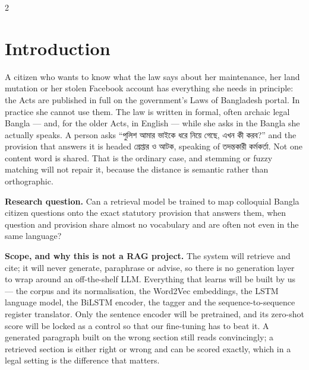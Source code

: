 \documentclass[11pt]{article}
\newcommand{\bng}[1]{{\bn #1}}
\begin{document}
\begin{multicols}{2}
\fontsize{9.3}{10.6}\selectfont
\raggedcolumns

\section{Introduction}
A citizen who wants to know what the law says about her maintenance, her land mutation or her stolen Facebook account has everything she needs in principle: the Acts are published in full on the government's Laws of Bangladesh portal. In practice she cannot use them. The law is written in formal, often archaic legal Bangla --- and, for the older Acts, in English --- while she asks in the Bangla she actually speaks. A person asks ``\bng{পুলিশ আমার ভাইকে ধরে নিয়ে গেছে, এখন কী করব?}'' and the provision that answers it is headed \bng{গ্রেপ্তার ও আটক}, speaking of \bng{তদন্তকারী কর্মকর্তা}. Not one content word is shared. That is the ordinary case, and stemming or fuzzy matching will not repair it, because the distance is semantic rather than orthographic.

\textbf{Research question.} Can a retrieval model be trained to map colloquial Bangla citizen questions onto the exact statutory provision that answers them, when question and provision share almost no vocabulary and are often not even in the same language?

\textbf{Scope, and why this is not a RAG project.} The system will retrieve and cite; it will never generate, paraphrase or advise, so there is no generation layer to wrap around an off-the-shelf LLM. Everything that learns will be built by us --- the corpus and its normalisation, the Word2Vec embeddings, the LSTM language model, the BiLSTM encoder, the tagger and the sequence-to-sequence register translator. Only the sentence encoder will be pretrained, and its zero-shot score will be locked as a control so that our fine-tuning has to beat it. A generated paragraph built on the wrong section still reads convincingly; a retrieved section is either right or wrong and can be scored exactly, which in a legal setting is the difference that matters.


\end{multicols}
\end{document}
